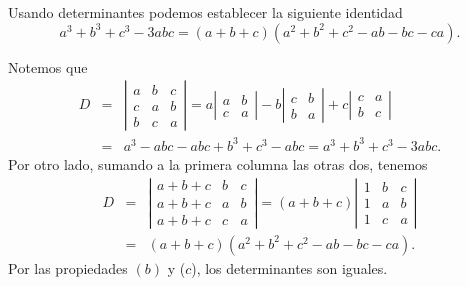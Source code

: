 \begin{ejemplo}
\label{ejemplocubicas}
Usando determinantes podemos establecer la siguiente iden\-tidad
\begin{equation}
a^3+b^3+c^3-3abc=(a+b+c)(a^2+b^2+c^2-ab-bc-ca).
\label{abccubicas}
\end{equation}
\end{ejemplo}
\noindent Notemos que 
\begin{eqnarray}
     D & = &\left |\begin{array}{ccc}
                a &  b & c\\[1mm]
                c &  a & b\\[1mm]
		 b &  c& a
              \end{array}\right |  =  a
            \left |\begin{array}{cc}
                  a &b\\[1mm]
                 c &  a
              \end{array}\right |-
      b \left |\begin{array}{cc}
                  c & b\\[1mm]
                 b & a
              \end{array}\right | +
        c \left |\begin{array}{cc}
                  c & a\\[1mm]
                  b &  c
              \end{array}\right |\nonumber\\
	      & = & a^3-abc-abc+b^3+c^3-abc=a^3+b^3+c^3-3abc. 	      	      	      \label{ecuacioncubicacondeterminantes}	      
\end{eqnarray}
Por otro lado, sumando a la primera columna las otras dos, tenemos
\begin{eqnarray*}
     D & = & \left |\begin{array}{ccc}
                a+b+c &  b & c\\[1mm]
                a+b+c &  a & b\\[1mm]
		 a+b+c &  c& a
              \end{array}\right |  =  (a+b+c)
            \left |\begin{array}{ccc}
                1 &  b & c\\[1mm]
                1 &  a & b\\[1mm]
		1 &  c& a
              \end{array}\right | \\[2mm]
	         & = & (a+b+c)(a^2+b^2+c^2-ab-bc-ca).
        \end{eqnarray*}
Por las propiedades $(b)$ y  ($c$), los determinantes son iguales. 

